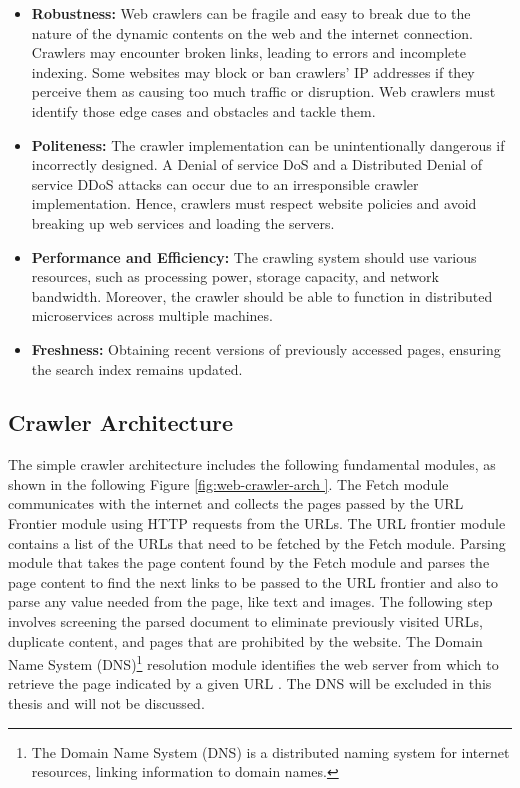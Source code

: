 \begin{itemize}
\item[] \textbf{Robustness:} Web crawlers can be fragile and easy to break due to the nature of the dynamic contents on the web and the internet connection. Crawlers may encounter broken links, leading to errors and incomplete indexing. Some websites may block or ban crawlers' IP addresses if they perceive them as causing too much traffic or disruption. Web crawlers must identify those edge cases and obstacles and tackle them.

\item[] \textbf{Politeness:} The crawler implementation can be unintentionally dangerous if incorrectly designed. A Denial of service DoS and a Distributed Denial of service DDoS attacks can occur due to an irresponsible crawler implementation. Hence, crawlers must respect website policies and avoid breaking up web services and loading the servers.

\item[] \textbf{Performance and Efficiency:} The crawling system should use various resources, such as processing power, storage capacity, and network bandwidth. Moreover, the crawler should be able to function in distributed microservices across multiple machines.

\item[] \textbf{Freshness:} Obtaining recent versions of previously accessed pages, ensuring the search index remains updated.
\end{itemize}

\subsection{Crawler Architecture}

The simple crawler architecture includes the following fundamental modules, as shown in the following Figure \ref{fig:web-crawler-arch
}. The Fetch module communicates with the internet and collects the pages passed by the URL Frontier module using HTTP requests from the URLs. The URL frontier module contains a list of the URLs that need to be fetched by the Fetch module. Parsing module that takes the page content found by the Fetch module and parses the page content to find the next links to be passed to the URL frontier and also to parse any value needed from the page, like text and images. The following step involves screening the parsed document to eliminate previously visited URLs, duplicate content, and pages that are prohibited by the website. The Domain Name System (DNS)\footnote{The Domain Name System (DNS) is a distributed naming system for internet resources, linking information to domain names.} resolution module identifies the web server from which to retrieve the page indicated by a given URL \cite{introduction-ir}. The DNS will be excluded in this thesis and will not be discussed. 

